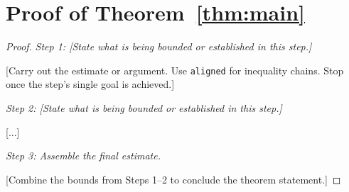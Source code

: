 \section{Proof of Theorem~\ref{thm:main}}\label{sec:proof}

\begin{proof}

\textit{Step 1: [State what is being bounded or established in this step.]}

[Carry out the estimate or argument. Use \texttt{aligned} for inequality
chains. Stop once the step's single goal is achieved.]

\textit{Step 2: [State what is being bounded or established in this step.]}

[...]

\textit{Step 3: Assemble the final estimate.}

[Combine the bounds from Steps 1--2 to conclude the theorem statement.]

\end{proof}
